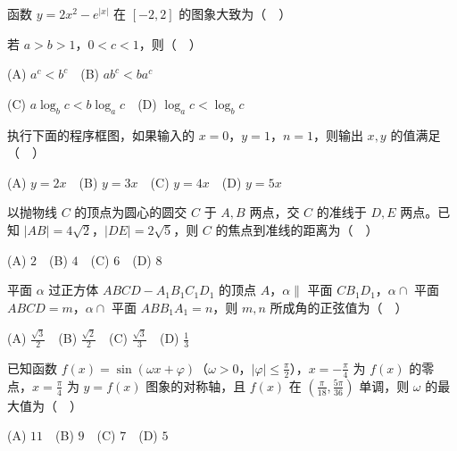 \begin{question}
函数 $y=2x^2-e^{|x|}$ 在 $[-2,2]$ 的图象大致为（　）
\nopagebreak[4]
\begin{center}\end{center}
\nopagebreak[4]
\end{question}
\begin{question}
若 $a>b>1$，$0<c<1$，则（　）

   (A) $a^c<b^c$　(B) $ab^c<ba^c$

   (C) $a\log_b c<b\log_a c$　(D) $\log_a c<\log_b c$

\Needspace{0.4\textheight}
\end{question}
\begin{question}
执行下面的程序框图，如果输入的 $x=0$，$y=1$，$n=1$，则输出 $x,y$ 的值满足（　）
\nopagebreak[4]
\begin{center}\end{center}
\nopagebreak[4]
   (A) $y=2x$　(B) $y=3x$　(C) $y=4x$　(D) $y=5x$

\end{question}
\begin{question}
以抛物线 $C$ 的顶点为圆心的圆交 $C$ 于 $A,B$ 两点，交 $C$ 的准线于 $D,E$ 两点。已知 $|AB|=4\sqrt2$，$|DE|=2\sqrt5$，则 $C$ 的焦点到准线的距离为（　）

   (A) $2$　(B) $4$　(C) $6$　(D) $8$

\end{question}
\begin{question}
平面 $\alpha$ 过正方体 $ABCD-A_1B_1C_1D_1$ 的顶点 $A$，$\alpha\parallel$ 平面 $CB_1D_1$，$\alpha\cap$ 平面 $ABCD=m$，$\alpha\cap$ 平面 $ABB_1A_1=n$，则 $m,n$ 所成角的正弦值为（　）

   (A) $\frac{\sqrt3}{2}$　(B) $\frac{\sqrt2}{2}$　(C) $\frac{\sqrt3}{3}$　(D) $\frac13$

\end{question}
\begin{question}
已知函数 $f(x)=\sin(\omega x+\varphi)$（$\omega>0$，$|\varphi|\leq\frac\pi2$），$x=-\frac\pi4$ 为 $f(x)$ 的零点，$x=\frac\pi4$ 为 $y=f(x)$ 图象的对称轴，且 $f(x)$ 在 $(\frac\pi{18},\frac{5\pi}{36})$ 单调，则 $\omega$ 的最大值为（　）

   (A) $11$　(B) $9$　(C) $7$　(D) $5$

\end{question}

